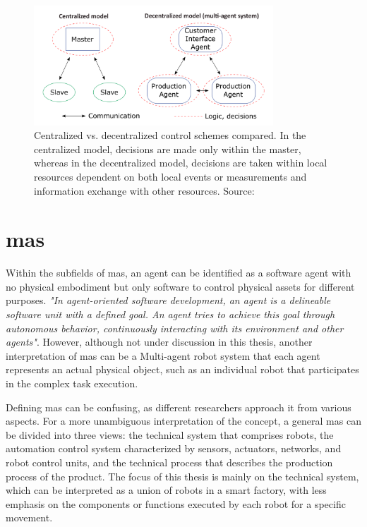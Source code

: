 \begin{figure}[htb]
    \centering
    \includegraphics[width=0.8\textwidth]{figures/State-of-the-art/CentralizeDecentralizeConcept.png}

    \caption{Centralized vs. decentralized control schemes compared. 
    In the centralized model, decisions are made only within the 
    master, whereas in the decentralized model, decisions are taken 
    within local resources dependent on both local events or measurements 
    and information exchange with other resources. 
    Source: \cite[fig.1]{egger_deployment-friendly_2020}\label{fig: CentralizeDecentralizeConcept}}
\end{figure}



\section{\gls{mas}}

Within the subfields of \gls{mas}, an agent can be identified as a 
software agent with no physical embodiment but only software to control 
physical assets for different purposes. \textit{"In agent-oriented software 
development, an agent is a delineable software unit with a defined goal. 
An agent tries to achieve this goal through autonomous behavior, 
continuously interacting with its environment and other agents"}\cite{wagner_agentenunterstutztes_2008}. 
However, although not under discussion in this thesis, another 
interpretation of \gls{mas} can be a Multi-agent robot system that 
each agent represents an actual physical object, such as an individual 
robot that participates in the complex task execution\cite{ota_multi-agent_2006}.   


Defining \gls{mas} can be confusing, as different researchers approach 
it from various aspects. For a more unambiguous interpretation of the 
concept, a general \gls{mas} can be divided into three views: the 
technical system that comprises robots, the automation control system 
characterized by sensors, actuators, networks, and robot control units, 
and the technical process that describes the production process of the 
product\cite{lauber_prozessautomatisierung_1999}\cite{wannagat_agent_nodate}. 
The focus of this thesis is mainly on the technical system, which can 
be interpreted as a union of robots in a smart factory, with less 
emphasis on the components or functions executed by each robot for 
a specific movement.

